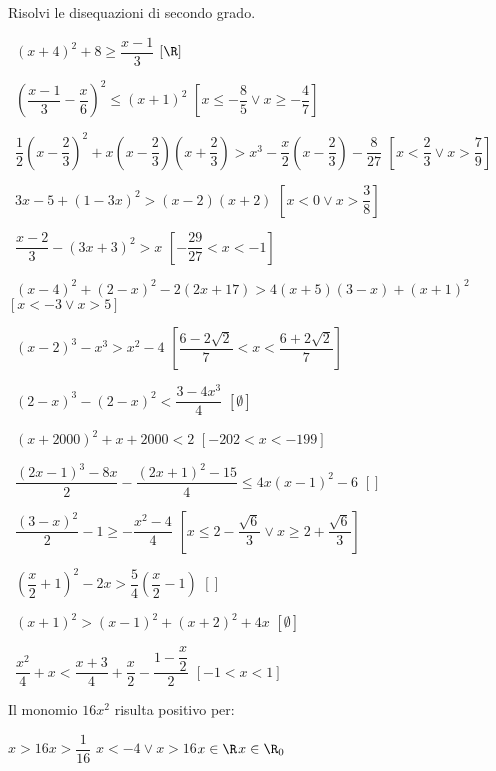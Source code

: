 \begin{esercizio}[*]
\label{ese:4.20}
Risolvi le disequazioni di secondo grado.
\vspace{\dy}
 \begin{enumeratea}
 \item~\((x+4)^2+8\ge \dfrac{x-1} 3\)
  \hfill \(\left[\R\right]\)
 \item~\(\left(\dfrac{x-1} 3-\dfrac x 6\right)^2\le (x+1)^2\)
  \hfill \(\left[x\le -\dfrac 8 5\vee x\ge -\dfrac 4 7\right]\)
 \item~\(\dfrac 1 2\left(x-\dfrac 2 3\right)^2+x\left(x-\dfrac 2 3\right)
  \left(x+\dfrac 2 3\right)>x^3-\dfrac x 2\left(x-\dfrac 2 3\right)-\dfrac 
8{27}\)
  \hfill \(\left[x<\dfrac 2 3\vee x>\dfrac 7 9\right]\)
 \item~\(3x-5+(1-3x)^2>(x-2)(x+2)\)
  \hfill \(\left[x<0\vee x>\dfrac 3 8\right]\)
 \item~\(\dfrac{x-2} 3-(3x+3)^2>x\)
  \hfill \(\left[-\dfrac{29}{27}<x<-1\right]\)
 \item~\((x-4)^2+(2-x)^2-2(2x+17)>4(x+5)(3-x)+(x+1)^2\)
  \hfill \(\left[x<-3\vee x>5\right]\)
 \item~\((x-2)^3-x^3>x^2-4\)
  \hfill \(\left[\dfrac{6-2\sqrt 2} 7<x<\dfrac{6+2\sqrt 2} 7\right]\)
 \item~\((2-x)^3-(2-x)^2<\dfrac{3-4x^3} 4\)
  \hfill \(\left[\emptyset\right]\)
 \item~\((x+2000)^2+x+2000<2\)
  \hfill \(\left[-202<x<-199\right]\)
 \item~\(\dfrac{\left(2x-1\right)^3-8x} 2-\dfrac{\left(2x+1\right)^2-15} 4\le 
 4x\left(x-1\right)^2-6\)
  \hfill \(\left[\right]\)
 \item~\(\dfrac{(3-x)^2} 2-1\ge -\dfrac{x^2-4} 4\) 
  \hfill \(\left[x\le 2-\dfrac{\sqrt 6} 3\vee x\ge 2+\dfrac{\sqrt 6} 
3\right]\)
 \item~\(\left(\dfrac x 2+1\right)^2-2x>\dfrac 5 4\left(\dfrac x 2-1\right)\)
  \hfill \(\left[\right]\)
 \item~\((x+1)^2>(x-1)^2+(x+2)^2+4x\)
  \hfill \(\left[\emptyset \right]\)
 \item~\(\dfrac{x^2} 4+x<\dfrac{x+3} 4+\dfrac x 2-\dfrac{1-\dfrac x 2} 2\)
  \hfill \(\left[-1<x<1\right]\)
 \end{enumeratea}
\end{esercizio}

\begin{esercizio}
\label{ese:4.23}
Il monomio \(16x^2\) risulta positivo per:

\quad \(x>16\)\qquad {}\quad \(x>\dfrac 1{16}\)\qquad{}\quad 
\(x<-4\vee 
x>16\)\qquad{}\quad \(x\in \R\)\qquad{}\quad \(x\in \R_0\)

\end{esercizio}

